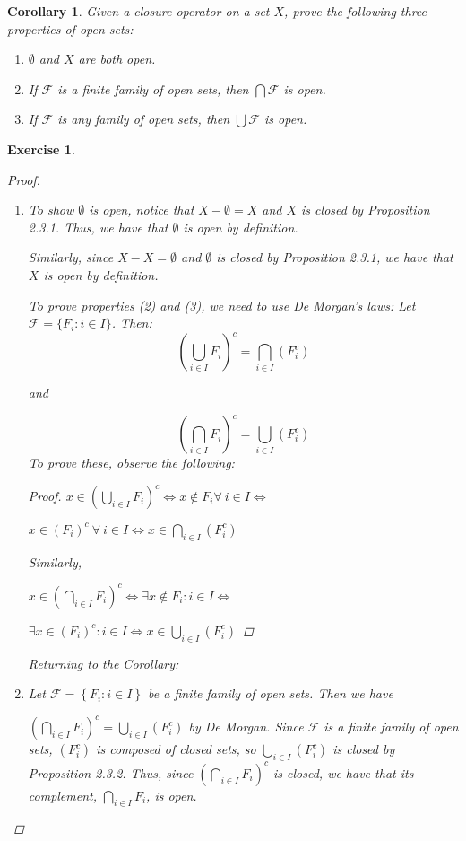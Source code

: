 \documentclass[12pt]{amsart}
\newtheorem{corollary}[theorem]{Corollary}
\newtheorem{exercise}{Exercise}[section]
\theoremstyle{definition}
\theoremstyle{remark}
\newcommand{\0}{\emptyset}
\newcommand{\F}{\mathcal F}
\begin{document}
\begin{corollary}
Given a closure operator on a set $X$, prove the following three properties of open sets:
\begin{enumerate}
\item $\0$ and $X$ are both open.
\item If $\F$ is a finite family of open sets, then $\bigcap \F$ is open.
\item If $\F$ is any family of open sets, then $\bigcup \F$ is open.
\end{enumerate}
\end{corollary}
\begin{exercise} 
\begin{proof}\rm\
	\begin{enumerate}
		\item To show $\0$ is open, notice that $X- \0 = X$ and $X$ is closed by Proposition 2.3.1. Thus, we have that $\0$ is open by definition. 
		
		Similarly, since $X-X=\0$ and $\0$ is closed by Proposition 2.3.1, we have that $X$ is open by definition.
	
	To prove properties (2) and (3), we need to use De Morgan's laws: Let $\F=\{F_i:i \in I\}$. Then:
		$$\left(\bigcup_{i \in I}F_i\right)^c = \bigcap_{i \in I}\left(F_i^c\right)$$ \begin{center}and
		\end{center}
		
		$$\left(\bigcap_{i \in I}F_i\right)^c = \bigcup_{i \in I}\left(F_i^c\right)$$
		To prove these, observe the following:
		\begin{proof}
			$x \in \left(\bigcup_{i \in I}F_i\right)^c \iff x \not\in F_i \forall\: i \in I \iff$ 
			
$			x \in \left(F_i\right)^c \:\forall\: i \in I \iff x \in \bigcap_{i \in I}\left(F_i^c\right)$
		
		Similarly,
	
	$x \in \left(\bigcap_{i \in I}F_i\right)^c \iff \exists x \not\in F_i : i \in I \iff$ 
	
	$			\exists x \in \left(F_i\right)^c : i \in I \iff x \in \bigcup_{i \in I}\left(F_i^c\right)$
\end{proof}
		
		Returning to the Corollary: 
		
		\item Let $\F = \left\{ F_i:i \in I \right\}$ be a finite family of open sets. Then we have
		
		 $\left( \bigcap_{i \in I}F_i \right)^c = \bigcup_{i \in I}\left(F_i^c\right)$ by De Morgan. Since $\F$ is a finite family of open sets, $\left( F_i^c \right)$ is composed of closed sets, so $\bigcup_{i \in I}\left(F_i^c\right)$ is closed by Proposition 2.3.2. Thus, since  $\left( \bigcap_{i \in I}F_i \right)^c$ is closed, we have that its complement, $ \bigcap_{i \in I}F_i$, is open.
		 

\end{enumerate}
\end{proof}
\end{exercise}
\end{document}
